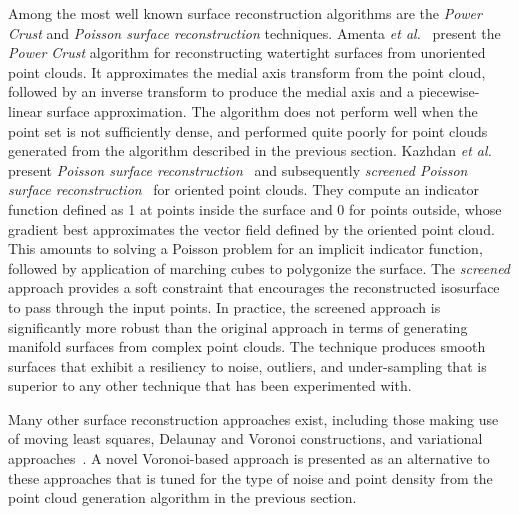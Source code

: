 Among the most well known surface reconstruction algorithms are the \textit{Power Crust} and \textit{Poisson surface reconstruction} techniques. Amenta \textit{et al.}~\cite{amenta_2001} present the \textit{Power Crust} algorithm for reconstructing watertight surfaces from unoriented point clouds. It approximates the medial axis transform from the point cloud, followed by an inverse transform to produce the medial axis and a piecewise-linear surface approximation. The algorithm does not perform well when the point set is not sufficiently dense, and performed quite poorly for point clouds generated from the algorithm described in the previous section. Kazhdan \textit{et al.} present \textit{Poisson surface reconstruction}~\cite{kazhdan_2008} and subsequently \textit{screened Poisson surface reconstruction}~\cite{kazhdan_2013} for oriented point clouds. They compute an indicator function defined as 1 at points inside the surface and 0 for points outside, whose gradient best approximates the vector field defined by the oriented point cloud. This amounts to solving a Poisson problem for an implicit indicator function, followed by application of marching cubes to polygonize the surface. The \textit{screened} approach provides a soft constraint that encourages the reconstructed isosurface to pass through the input points. In practice, the screened approach is significantly more robust than the original approach in terms of generating manifold surfaces from complex point clouds. The technique produces smooth surfaces that exhibit a resiliency to noise, outliers, and under-sampling that is superior to any other technique that has been experimented with.

Many other surface reconstruction approaches exist, including those making use of moving least squares, Delaunay and Voronoi constructions, and variational approaches~\cite{berger}. A novel Voronoi-based approach is presented as an alternative to these approaches that is tuned for the type of noise and point density from the point cloud generation algorithm in the previous section.


